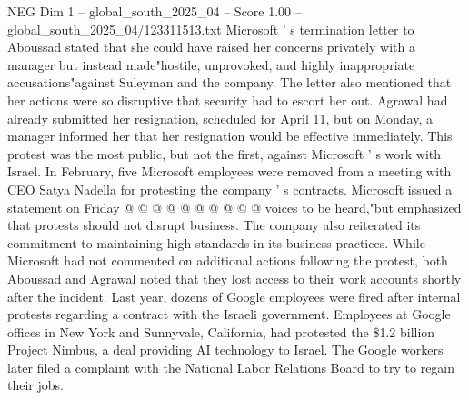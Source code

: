 \begin{textsample}{NEG Dim 1 – global\_south\_2025\_04 – Score 1.00 – global\_south\_2025\_04/123311513.txt}
Microsoft ' s termination letter to Aboussad stated that she could have raised her concerns privately with a manager but instead made"hostile, unprovoked, and highly inappropriate accusations"against Suleyman and the company.
The letter also mentioned that her actions were so disruptive that security had to escort her out.
Agrawal had already submitted her resignation, scheduled for April 11, but on Monday, a manager informed her that her resignation would be effective immediately.
This protest was the most public, but not the first, against Microsoft ' s work with Israel.
In February, five Microsoft employees were removed from a meeting with CEO Satya Nadella for protesting the company ' s contracts.
Microsoft issued a statement on Friday @ @ @ @ @ @ @ @ @ @ voices to be heard,"but emphasized that protests should not disrupt business.
The company also reiterated its commitment to maintaining high standards in its business practices.
While Microsoft had not commented on additional actions following the protest, both Aboussad and Agrawal noted that they lost access to their work accounts shortly after the incident.
Last year, dozens of Google employees were fired after internal protests regarding a contract with the Israeli government.
Employees at Google offices in New York and Sunnyvale, California, had protested the \$1.2 billion Project Nimbus, a deal providing AI technology to Israel.
The Google workers later filed a complaint with the National Labor Relations Board to try to regain their jobs.

\end{textsample}
